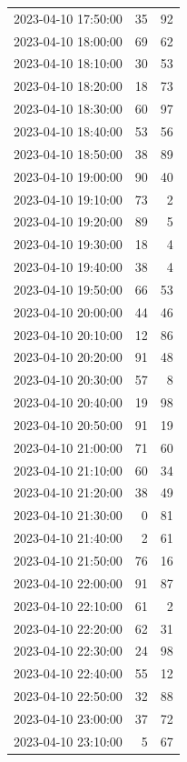 \documentclass[
  letterpaper,
  DIV=11,
  numbers=noendperiod]{scrartcl}
\begin{document}
\begin{tabular}{lrr}
2023-04-10 17:50:00 &    35 &    92 \\
2023-04-10 18:00:00 &    69 &    62 \\
2023-04-10 18:10:00 &    30 &    53 \\
2023-04-10 18:20:00 &    18 &    73 \\
2023-04-10 18:30:00 &    60 &    97 \\
2023-04-10 18:40:00 &    53 &    56 \\
2023-04-10 18:50:00 &    38 &    89 \\
2023-04-10 19:00:00 &    90 &    40 \\
2023-04-10 19:10:00 &    73 &     2 \\
2023-04-10 19:20:00 &    89 &     5 \\
2023-04-10 19:30:00 &    18 &     4 \\
2023-04-10 19:40:00 &    38 &     4 \\
2023-04-10 19:50:00 &    66 &    53 \\
2023-04-10 20:00:00 &    44 &    46 \\
2023-04-10 20:10:00 &    12 &    86 \\
2023-04-10 20:20:00 &    91 &    48 \\
2023-04-10 20:30:00 &    57 &     8 \\
2023-04-10 20:40:00 &    19 &    98 \\
2023-04-10 20:50:00 &    91 &    19 \\
2023-04-10 21:00:00 &    71 &    60 \\
2023-04-10 21:10:00 &    60 &    34 \\
2023-04-10 21:20:00 &    38 &    49 \\
2023-04-10 21:30:00 &     0 &    81 \\
2023-04-10 21:40:00 &     2 &    61 \\
2023-04-10 21:50:00 &    76 &    16 \\
2023-04-10 22:00:00 &    91 &    87 \\
2023-04-10 22:10:00 &    61 &     2 \\
2023-04-10 22:20:00 &    62 &    31 \\
2023-04-10 22:30:00 &    24 &    98 \\
2023-04-10 22:40:00 &    55 &    12 \\
2023-04-10 22:50:00 &    32 &    88 \\
2023-04-10 23:00:00 &    37 &    72 \\
2023-04-10 23:10:00 &     5 &    67 \\

\end{tabular}
\end{document}
